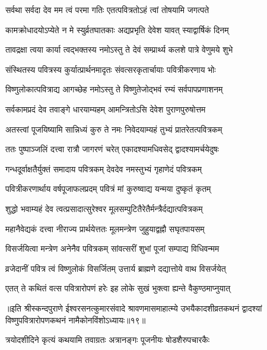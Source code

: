 \twolineshloka
{सर्वथा सर्वदा देव मम त्वं परमा गतिः}
{एतत्पवित्रतोऽहं त्वां तोषयामि जगत्पते} %

\twolineshloka
{कामक्रोधादयोऽप्येते न मे स्युर्व्रतघातकाः}
{अद्यप्रभृति देवेश यावत् स्याद्वार्षिकं दिनम्} %

\twolineshloka
{तावद्रक्षा त्वया कार्या त्वद्भक्तस्य नमोऽस्तु ते}
{देवं सम्प्रार्थ्य कलशे पात्रे वेणुमये शुभे} %

\twolineshloka
{संस्थितस्य पवित्रस्य कुर्यात्प्रार्थनमादृतः}
{संवत्सरकृतार्चायाः पवित्रीकरणाय भोः} %

\twolineshloka
{विष्णुलोकात्पवित्राद्य आगच्छेह नमोऽस्तु ते}
{विष्णुतेजोद्भवं रम्यं सर्वपापप्रणाशनम्} %

\twolineshloka
{सर्वकामप्रदं देव तवाङ्गे धारयाम्यहम्}
{आमन्त्रितोऽसि देवेश पुराणपुरुषोत्तम} %

\twolineshloka
{अतस्त्वां पूजयिष्यामि सान्निध्यं कुरु ते नमः}
{निवेदयाम्यहं तुभ्यं प्रातरेतत्पवित्रकम्} %

\twolineshloka
{ततः पुष्पाञ्जलिं दत्त्वा रात्रौ जागरणं चरेत्}
{एकादश्यामधिवसेद् द्वादश्यामर्चयेदुषः} %

\twolineshloka
{गन्धदूर्वाक्षतैर्युक्तं समादाय पवित्रकम्}
{देवदेव नमस्तुभ्यं गृहाणेदं पवित्रकम्} %

\twolineshloka
{पवित्रीकरणार्थाय वर्षपूजाफलप्रदम्}
{पवित्रं मां कुरुष्वाद्य यन्मया दुष्कृतं कृतम्} %

\twolineshloka
{शुद्धो भवाम्यहं देव त्वत्प्रसादात्सुरेश्वर}
{मूलसम्पुटितैरेतैर्मन्त्रैर्दद्यात्पवित्रकम्} %

\twolineshloka
{महानैवेद्यकं दत्त्वा नीराज्य प्रार्थयेत्ततः}
{मूलमन्त्रेण जुहुयाद्वह्नौ सघृतपायसम्} %

\twolineshloka
{विसर्जयित्वा मन्त्रेण अनेनैव पवित्रकम्}
{सांवत्सरीं शुभां पूजां सम्पाद्य विधिवन्मम} %

\twolineshloka
{व्रजेदानीं पवित्र त्वं विष्णुलोकं विसर्जितम्}
{उत्तार्य ब्राह्मणे दद्यात्तोये वाथ विसर्जयेत्} %

\twolineshloka
{एतत् ते कथितं वत्स पवित्रारोपणं हरेः}
{इह लोके सुखं भुक्त्वा ह्यन्ते वैकुण्ठमाप्नुयात्} %


{॥इति श्रीस्कन्दपुराणे ईश्वरसनत्कुमारसंवादे श्रावणमासमाहात्म्ये उभयैकादशीव्रतकथनं द्वादश्यां विष्णुपवित्रारोपणकथनं नामैकोनविंशोऽध्यायः॥१९॥}





\twolineshloka
{त्रयोदशीदिने कृत्यं कथयामि तवाग्रतः}
{अत्रानङ्गः पूजनीयः षोडशैरुपचारकैः} %

